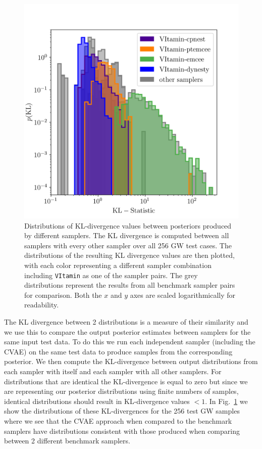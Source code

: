 %
\begin{figure}
    \includegraphics[width=\columnwidth]{hist-kl.png}
    \caption[Distributions of \ac{KL}-divergence values
between posteriors produced by different samplers.]{\label{fig:kl_results} Distributions of \ac{KL}-divergence values
between posteriors produced by different samplers. The \ac{KL} divergence is
computed between all samplers with every other sampler over all 256 \ac{GW}
test cases. The distributions of the resulting \ac{KL} divergence values are
then plotted, with each color representing a different sampler combination
including \texttt{VItamin} as one of the sampler pairs. The grey distributions
represent the results from all benchmark sampler pairs for comparison. Both the
$x$ and $y$ axes are scaled logarithmically for readability.}
\end{figure}
%

%
%
The \ac{KL} divergence between 2 distributions is a measure of their similarity
and we use this to compare the output posterior estimates between samplers for
the same input test data. To do this we run each independent sampler (including
the \ac{CVAE}) on the same test data to produce samples from the corresponding
posterior. We then compute the \ac{KL}-divergence between output distributions
from each sampler with itself and each sampler with all other samplers. For
distributions that are identical the \ac{KL}-divergence is equal to zero but
since we are representing our posterior distributions using finite numbers of
samples, identical distributions should result in KL-divergence values $<1$. In
Fig.~\ref{fig:kl_results} we show the distributions of these
\ac{KL}-divergences for the 256 test \ac{GW} samples where we see that the
\ac{CVAE} approach when compared to the benchmark samplers have distributions
consistent with those produced when comparing between 2 different benchmark
samplers.

